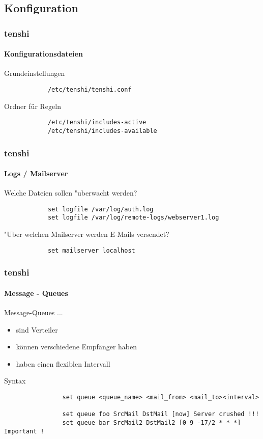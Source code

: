 \subsection{Konfiguration}
\begin{frame}[fragile]
	\frametitle{tenshi}
	\framesubtitle{Konfigurationsdateien}
	\begin{block}{Grundeinstellungen}
		\begin{verbatim}
			/etc/tenshi/tenshi.conf
		\end{verbatim}
	\end{block}
	\bigskip
	\begin{block}{Ordner für Regeln}
		\begin{verbatim}
			/etc/tenshi/includes-active
			/etc/tenshi/includes-available
		\end{verbatim}
	\end{block}	
\end{frame}

\begin{frame}[fragile]
	\frametitle{tenshi}
	\framesubtitle{Logs / Mailserver}
	\begin{block}{Welche Dateien sollen "uberwacht werden?}
		\begin{verbatim}
			set logfile /var/log/auth.log
			set logfile /var/log/remote-logs/webserver1.log
		\end{verbatim}	
	\end{block}
	\bigskip
	\begin{block}{"Uber welchen Mailserver werden E-Mails versendet?}
		\begin{verbatim}
			set mailserver localhost
		\end{verbatim}	
	\end{block}
\end{frame}

\begin{frame}[fragile]
	\frametitle{tenshi}
	\framesubtitle{Message - Queues}
	Message-Queues ... 
	\begin{itemize}
		\item sind Verteiler
		\item können verschiedene Empfänger haben
		\item haben einen flexiblen Intervall
	\end{itemize}
	\bigskip
	\begin{block}{Syntax}
		\begin{scriptsize}
			\begin{verbatim}
				set queue <queue_name> <mail_from> <mail_to><interval>

				set queue foo SrcMail DstMail [now] Server crushed !!!
				set queue bar SrcMail2 DstMail2 [0 9 -17/2 * * *] Important !
			\end{verbatim}
		\end{scriptsize}
	\end{block}
\end{frame}

